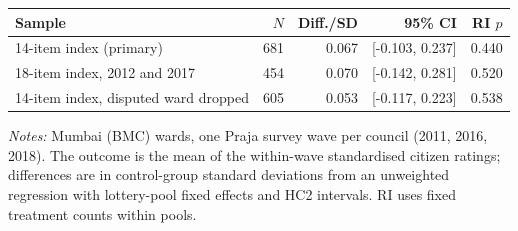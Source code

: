 \begin{tabular}{lrrrr}
\toprule
Sample & $N$ & Diff./SD & 95\% CI & RI $p$ \\
\midrule
14-item index (primary) & 681 & 0.067 & [-0.103, 0.237] & 0.440 \\
18-item index, 2012 and 2017 & 454 & 0.070 & [-0.142, 0.281] & 0.520 \\
14-item index, disputed ward dropped & 605 & 0.053 & [-0.117, 0.223] & 0.538 \\
\bottomrule
\end{tabular}
\parbox{\linewidth}{\scriptsize \emph{Notes:} Mumbai (BMC) wards, one Praja survey wave per council (2011, 2016, 2018). The outcome is the mean of the within-wave standardised citizen ratings; differences are in control-group standard deviations from an unweighted regression with lottery-pool fixed effects and HC2 intervals. RI uses fixed treatment counts within pools.}
